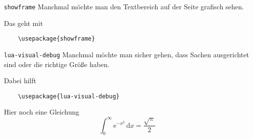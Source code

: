 \AddToShipoutPictureFG*{\ShowFramePicture}
\begin{frame}[fragile]{\texttt{showframe}}
  Manchmal möchte man den Textbereich auf der Seite grafisch sehen.

  Das geht mit
  \begin{lstlisting}
    \usepackage{showframe}
  \end{lstlisting}
\end{frame}

\begin{frame}[fragile]{\texttt{lua-visual-debug}}
  Manchmal möchte man sicher gehen, dass Sachen ausgerichtet sind oder die richtige Größe haben.
  
  Dabei hilft
  \begin{lstlisting}
    \usepackage{lua-visual-debug}
  \end{lstlisting}

  \vspace{2\baselineskip}
  Hier noch eine Gleichung
  \begin{equation}
    \int_0^\infty \mathup{e}^{-x^2} \, \mathup{d}x = \frac{\sqrt{\mathup{\pi}}}{2}
  \end{equation}
\end{frame}

